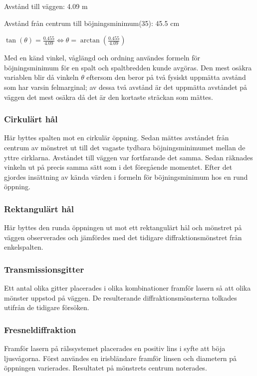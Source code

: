 \documentclass[conference]{IEEEtran}
\begin{document}
Avstånd till väggen: 4.09 m 

Avstånd från centrum till böjningsminimum(35): 45.5 cm
\vspace{12pt}

\begin{math}
\tan(\theta)  = \frac{0.455}{4.09} \Longleftrightarrow
\theta = \arctan(\frac{0.455}{4.09})
\end{math}\vspace{12pt}

Med en känd vinkel, våglängd och ordning användes formeln för böjningsminimum för en spalt och spaltbredden kunde avgöras. Den mest osäkra variablen blir då vinkeln $\theta$ eftersom den beror på två fysiskt uppmätta avstånd som har varsin felmarginal; av dessa två avstånd är det uppmätta avståndet på väggen det mest osäkra då det är den kortaste sträckan som mättes.

\subsubsection{Cirkulärt hål}

Här byttes spalten mot en cirkulär öppning. Sedan mättes avståndet från centrum av mönstret ut till det vagaste tydbara böjningsminimumet mellan de yttre cirklarna. Avståndet till väggen var fortfarande det samma. Sedan räknades vinkeln ut på precis samma sätt som i det föregående momentet. Efter det gjordes insättning av kända värden i formeln för böjningsminimum hos en rund öppning.

\subsubsection{Rektangulärt hål}
Här byttes den runda öppningen ut mot ett rektangulärt hål och mönstret på väggen observerades och jämfördes med det tidigare diffraktionsmönstret från enkelspalten.

\subsubsection{Transmissionsgitter}
Ett antal olika gitter placerades i olika kombinationer framför lasern så att olika mönster uppstod på väggen. De resulterande diffraktionsmönsterna tolkades utifrån de tidigare försöken. 

\subsubsection{Fresneldiffraktion}
Framför lasern på rälssystemet placerades en positiv lins i syfte att böja ljusvågorna. Först användes en irisbländare framför linsen och diametern på öppningen varierades. Resultatet på mönstrets centrum noterades. 
\end{document}
